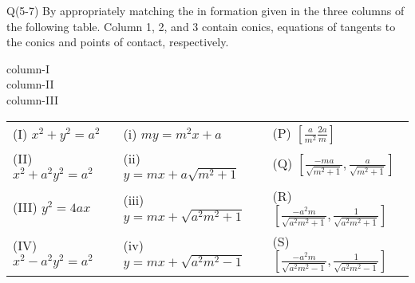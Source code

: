 \documentclass[12pt]{article}
\providecommand{\sbrak}[1]{\ensuremath{{}\left[#1\right]}}
\begin{document}
\begin{enumerate}
Q(5-7) By appropriately matching the in formation given in the three columns of the following table. Column 1, 2, and 3 contain conics, equations of tangents to the conics and points of contact, respectively. 
\begin{multicols}{3}
column-I \\
column-II \\
column-III

\end{multicols}

\begin{tabular}{ m{3.5cm} m{4.5cm} m{4.5cm} }
(I)  $x^2+y^2=a^2$ & (i) $my=m^2x+a$ & (P) $\sbrak{\frac{a}{m^2}\frac{2a}{m}}$  \\ 
(II) $x^2+a^2y^2=a^2$ & (ii) $y=mx+a\sqrt{m^2+1}$ & (Q) $\sbrak{\frac{-ma}{\sqrt{m^2+1}},\frac{a}{\sqrt{m^2+1}}}$ \\  
(III) $y^2=4ax$ & (iii) $y=mx+\sqrt{a^2m^2+1}$ & (R) $\sbrak{\frac{-a^2m}{\sqrt{a^2m^2+1}},\frac{1}{\sqrt{a^2m^2+1}}}$ \\
(IV) $x^2-a^2y^2=a^2$ & (iv) $y=mx+\sqrt{a^2m^2-1}$ &  (S) $\sbrak{\frac{-a^2m}{\sqrt{a^2m^2-1}},\frac{1}{\sqrt{a^2m^2-1}}}$ 
\end{tabular}




\end{enumerate}
\end{document}
